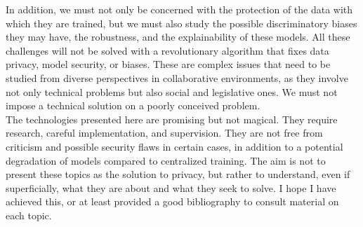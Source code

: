 In addition, we must not only be concerned with the protection of the data with which they are trained, but we must also study the possible discriminatory biases they may have, the robustness, and the explainability of these models. All these challenges will not be solved with a revolutionary algorithm that fixes data privacy, model security, or biases. These are complex issues that need to be studied from diverse perspectives in collaborative environments, as they involve not only technical problems but also social and legislative ones. We must not impose a technical solution on a poorly conceived problem.\\
The technologies presented here are promising but not magical. They require research, careful implementation, and supervision. They are not free from criticism and possible security flaws in certain cases, in addition to a potential degradation of models compared to centralized training. The aim is not to present these topics as the solution to privacy, but rather to understand, even if superficially, what they are about and what they seek to solve. I hope I have achieved this, or at least provided a good bibliography to consult material on each topic.\\
